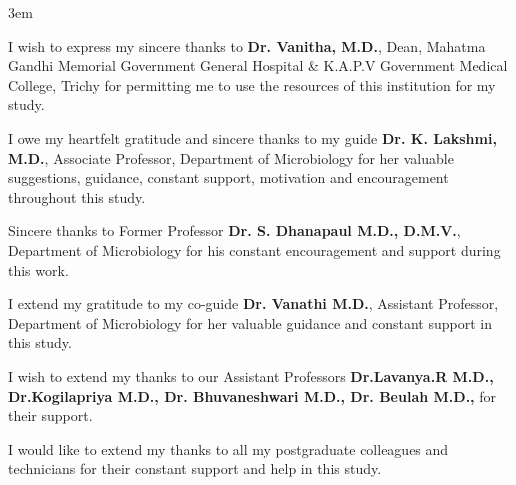 \acknowledgements


\setlength {\parindent} {3em} 

I wish to express my sincere thanks to \textbf{Dr. Vanitha, M.D.}, Dean, Mahatma Gandhi  Memorial Government General Hospital \& K.A.P.V Government Medical College, Trichy for permitting me to use the resources of this institution for my study. \par

I owe my heartfelt gratitude and sincere thanks to my guide \textbf {Dr. K. Lakshmi, M.D.}, Associate Professor, Department of Microbiology for her valuable suggestions, guidance, constant support, motivation and encouragement throughout this study. \par

Sincere thanks to Former Professor \textbf {Dr. S. Dhanapaul M.D., D.M.V.}, Department of Microbiology for his constant encouragement and support during this work. \par



I extend my gratitude to my co-guide \textbf {Dr. Vanathi M.D.}, Assistant
Professor, Department of Microbiology for her valuable guidance and constant support in this study. \par


I wish to extend my thanks to our Assistant Professors \textbf {Dr.Lavanya.R M.D., Dr.Kogilapriya M.D., Dr. Bhuvaneshwari M.D., Dr. Beulah M.D.,} for their support. \par


I would like to extend my thanks to all my postgraduate colleagues and technicians for their constant support and help in this study. \par

